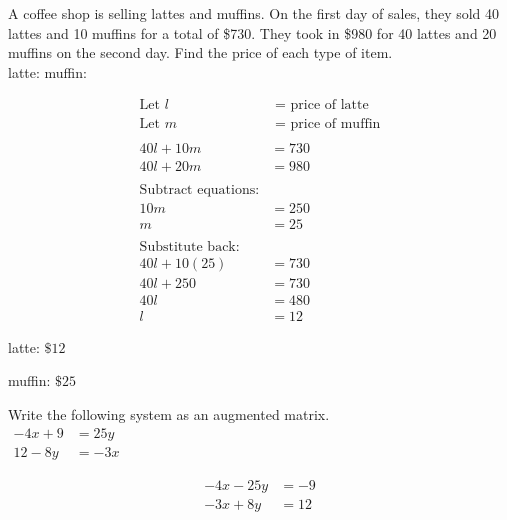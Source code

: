 \documentclass[addpoints]{exam}
\begin{document}
\begin{questions}
\begin{center}
\end{center}
\newpage

\question[6] A coffee shop is selling lattes and muffins. On the first day of sales, they sold 40 lattes and 10 muffins for a total of \$730. They took in \$980 for 40 lattes and 20 muffins on the second day. Find the price of each type of item.
\\
latte: \fillin[][1.5in]  muffin: \fillin[][1.5in]
\begin{solution}
\[\begin{aligned} \text{Let } l &\text{ = price of latte} \\ \text{Let } m &\text{ = price of muffin} \\ \\ 40l + 10m &= 730 \\ 40l + 20m &= 980 \\ \\ \text{Subtract equations:} & \\ 10m &= 250 \\ m &= 25 \\ \\ \text{Substitute back:} & \\ 40l + 10(25) &= 730 \\ 40l + 250 &= 730 \\ 40l &= 480 \\ l &= 12 \end{aligned}\]

latte: \(\boxed{ \text{\$} 12 }\)

muffin: \(\boxed{ \text{\$} 25 }\)
\end{solution}
\newpage

\question[4] Write the following system as an augmented matrix.\\
    
\(\displaystyle{ \begin{aligned} -4x + 9 &= 25y \\ 12 - 8y &= -3x \end{aligned} }\)
\begin{solution}
\[\begin{aligned} -4x - 25y &= -9 \\ -3x + 8y &= 12 \end{aligned}\]


\end{solution}
\end{questions}
\end{document}
